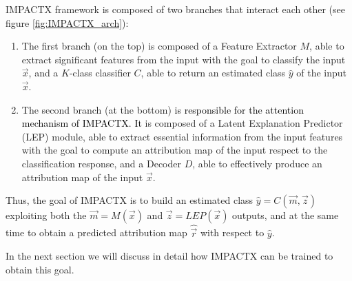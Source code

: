 IMPACTX framework is composed of two branches that interact each other (see figure \ref{fig:IMPACTX_arch}): 
\begin{enumerate}
    \item The first branch (on the top) is composed of a Feature Extractor $M$, able to extract significant features from the input with the goal to classify the input $\vec{x}$, and a $K$-class classifier $C$, able to return an estimated class $\hat{y}$ of the input $\vec{x}$. 
    \item The second branch (at the bottom)     \textcolor{black}{
     is responsible for the attention mechanism of IMPACTX. It}
 is composed of a Latent Explanation Predictor (LEP) module, able to extract essential information from the input features with the goal to compute an attribution map of the input respect to the classification response, and a Decoder $D$, able to effectively produce an attribution  map of the input $\vec{x}$. 
\end{enumerate}

Thus, the goal of IMPACTX is to build an estimated class $\hat{y}=C(\vec{m},\vec{z})$ exploiting both the $\vec{m}=M(\vec{x})$ and $\vec{z}=LEP(\vec{x})$ outputs, and at the same time to obtain a predicted attribution map $\hat{\vec{r}}$ with respect to $\hat{y}$. 

In the next section we will discuss in detail how IMPACTX can be trained to obtain this goal. 





